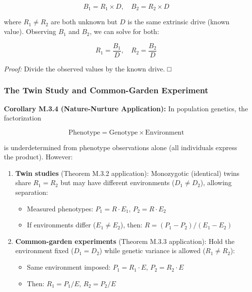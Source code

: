 \documentclass[
]{article}
\providecommand{\tightlist}{%
  \setlength{\itemsep}{0pt}\setlength{\parskip}{0pt}}
\begin{document}
\[B_1 = R_1 \times D, \quad B_2 = R_2 \times D\]

where \(R_1 \neq R_2\) are both unknown but \(D\) is the same extrinsic
drive (known value). Observing \(B_1\) and \(B_2\), we can solve for
both:

\[R_1 = \frac{B_1}{D}, \quad R_2 = \frac{B_2}{D}\]

\emph{Proof:} Divide the observed values by the known drive. □

\subsubsection{The Twin Study and Common-Garden
Experiment}\label{the-twin-study-and-common-garden-experiment}

\textbf{Corollary M.3.4 (Nature-Nurture Application):} In population
genetics, the factorization

\[\text{Phenotype} = \text{Genotype} \times \text{Environment}\]

is underdetermined from phenotype observations alone (all individuals
express the product). However:

\begin{enumerate}
\def\labelenumi{\arabic{enumi}.}
\tightlist
\item
  \textbf{Twin studies} (Theorem M.3.2 application): Monozygotic
  (identical) twins share \(R_1 = R_2\) but may have different
  environments (\(D_1 \neq D_2\)), allowing separation:

  \begin{itemize}
  \tightlist
  \item
    Measured phenotypes: \(P_1 = R \cdot E_1\), \(P_2 = R \cdot E_2\)
  \item
    If environments differ (\(E_1 \neq E_2\)), then:
    \(R = (P_1 - P_2)/(E_1 - E_2)\)
  \end{itemize}
\item
  \textbf{Common-garden experiments} (Theorem M.3.3 application): Hold
  the environment fixed (\(D_1 = D_2\)) while genetic variance is
  allowed (\(R_1 \neq R_2\)):

  \begin{itemize}
  \tightlist
  \item
    Same environment imposed: \(P_1 = R_1 \cdot E\),
    \(P_2 = R_2 \cdot E\)
  \item
    Then: \(R_1 = P_1 / E\), \(R_2 = P_2 / E\)
  \end{itemize}
\end{enumerate}
\end{document}
